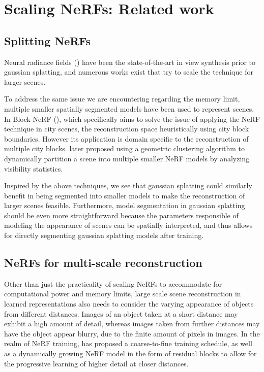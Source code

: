 \documentclass[logo,bsc,singlespacing,parskip]{infthesis}
\begin{document}
\section{Scaling NeRFs: Related work}

\subsection{Splitting NeRFs}

Neural radiance fields (\cite{nerf}) have been the state-of-the-art in view synthesis prior to gaussian splatting, and numerous works exist that try to scale the technique for larger scenes.

To address the same issue we are encountering regarding the memory limit, multiple smaller spatially segmented models have been used to represent scenes. In Block-NeRF (\cite{blocknerf}), which specifically aims to solve the issue of applying the NeRF technique in city scenes, the reconstruction space heuristically using city block boundaries. However its application is domain specific to the reconstruction of multiple city blocks. \cite{meganerf} later proposed using a geometric clustering algorithm to dynamically partition a scene into multiple smaller NeRF models by analyzing visibility statistics.

Inspired by the above techniques, we see that gaussian splatting could similarly benefit in being segmented into smaller models to make the reconstruction of larger scenes feasible. Furthermore, model segmentation in gaussian splatting should be even more straightforward because the parameters responsible of modeling the appearance of scenes can be spatially interpreted, and thus allows for directly segmenting gaussian splatting models after training.

\subsection{NeRFs for multi-scale reconstruction}

Other than just the practicality of scaling NeRFs to accommodate for computational power and memory limits, large scale scene reconstruction in learned representations also needs to consider the varying appearance of objects from different distances. Images of an object taken at a short distance may exhibit a high amount of detail, whereas images taken from further distances may have the object appear blurry, due to the finite amount of pixels in images. In the realm of NeRF training, \cite{bungeenerf} has proposed a coarse-to-fine training schedule, as well as a dynamically growing NeRF model in the form of residual blocks to allow for the progressive learning of higher detail at closer distances.
\end{document}
